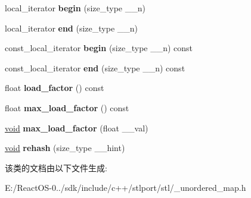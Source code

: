 \begin{DoxyCompactItemize}
\item 
\mbox{\label{classunordered__multimap_afddbda4fc710fa745807f444cb6811ab}} 
local\+\_\+iterator {\bfseries begin} (size\+\_\+type \+\_\+\+\_\+n)
\item 
\mbox{\label{classunordered__multimap_ac8a34278d5dd23c34f0a49604bc27ccb}} 
local\+\_\+iterator {\bfseries end} (size\+\_\+type \+\_\+\+\_\+n)
\item 
\mbox{\label{classunordered__multimap_a2244d0e31c835f5899867a8adc6c29bb}} 
const\+\_\+local\+\_\+iterator {\bfseries begin} (size\+\_\+type \+\_\+\+\_\+n) const
\item 
\mbox{\label{classunordered__multimap_a2e8a0f6645ef5b32d952e21bddcde8c7}} 
const\+\_\+local\+\_\+iterator {\bfseries end} (size\+\_\+type \+\_\+\+\_\+n) const
\item 
\mbox{\label{classunordered__multimap_a7ff2ba2fe3373fcd9b244cd5e446f7ea}} 
float {\bfseries load\+\_\+factor} () const
\item 
\mbox{\label{classunordered__multimap_aadb396a7d5b2b3fe41ee856d550f7dfb}} 
float {\bfseries max\+\_\+load\+\_\+factor} () const
\item 
\mbox{\label{classunordered__multimap_a3aa8e92df36c05b480c0b07990deb312}} 
\hyperlink{interfacevoid}{void} {\bfseries max\+\_\+load\+\_\+factor} (float \+\_\+\+\_\+val)
\item 
\mbox{\label{classunordered__multimap_a28e5c92df6fd74a782ce7b5728118e88}} 
\hyperlink{interfacevoid}{void} {\bfseries rehash} (size\+\_\+type \+\_\+\+\_\+hint)
\end{DoxyCompactItemize}


该类的文档由以下文件生成\+:\begin{DoxyCompactItemize}
\item 
E\+:/\+React\+O\+S-\/0../sdk/include/c++/stlport/stl/\+\_\+unordered\+\_\+map.\+h\end{DoxyCompactItemize}
